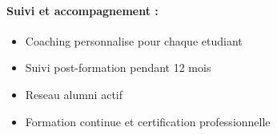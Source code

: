 \paragraph{Suivi et accompagnement :}
\begin{itemize}
    \item Coaching personnalise pour chaque etudiant
    \item Suivi post-formation pendant 12 mois
    \item Reseau alumni actif
    \item Formation continue et certification professionnelle
\end{itemize}
